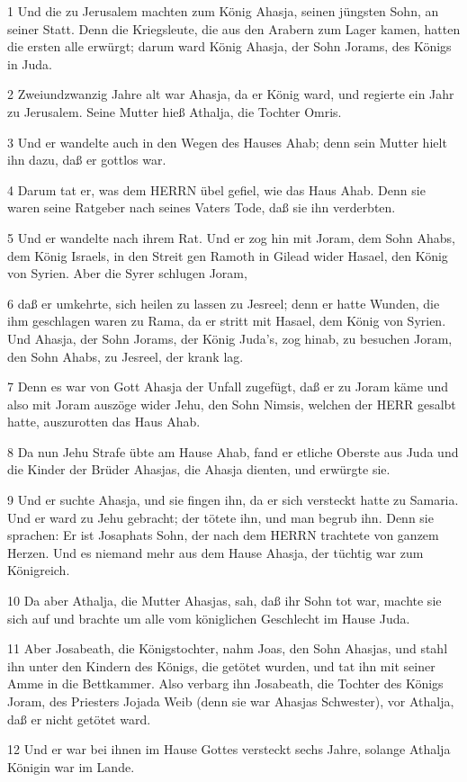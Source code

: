 \par 1 Und die zu Jerusalem machten zum König Ahasja, seinen jüngsten Sohn, an seiner Statt. Denn die Kriegsleute, die aus den Arabern zum Lager kamen, hatten die ersten alle erwürgt; darum ward König Ahasja, der Sohn Jorams, des Königs in Juda.
\par 2 Zweiundzwanzig Jahre alt war Ahasja, da er König ward, und regierte ein Jahr zu Jerusalem. Seine Mutter hieß Athalja, die Tochter Omris.
\par 3 Und er wandelte auch in den Wegen des Hauses Ahab; denn sein Mutter hielt ihn dazu, daß er gottlos war.
\par 4 Darum tat er, was dem HERRN übel gefiel, wie das Haus Ahab. Denn sie waren seine Ratgeber nach seines Vaters Tode, daß sie ihn verderbten.
\par 5 Und er wandelte nach ihrem Rat. Und er zog hin mit Joram, dem Sohn Ahabs, dem König Israels, in den Streit gen Ramoth in Gilead wider Hasael, den König von Syrien. Aber die Syrer schlugen Joram,
\par 6 daß er umkehrte, sich heilen zu lassen zu Jesreel; denn er hatte Wunden, die ihm geschlagen waren zu Rama, da er stritt mit Hasael, dem König von Syrien. Und Ahasja, der Sohn Jorams, der König Juda's, zog hinab, zu besuchen Joram, den Sohn Ahabs, zu Jesreel, der krank lag.
\par 7 Denn es war von Gott Ahasja der Unfall zugefügt, daß er zu Joram käme und also mit Joram auszöge wider Jehu, den Sohn Nimsis, welchen der HERR gesalbt hatte, auszurotten das Haus Ahab.
\par 8 Da nun Jehu Strafe übte am Hause Ahab, fand er etliche Oberste aus Juda und die Kinder der Brüder Ahasjas, die Ahasja dienten, und erwürgte sie.
\par 9 Und er suchte Ahasja, und sie fingen ihn, da er sich versteckt hatte zu Samaria. Und er ward zu Jehu gebracht; der tötete ihn, und man begrub ihn. Denn sie sprachen: Er ist Josaphats Sohn, der nach dem HERRN trachtete von ganzem Herzen. Und es niemand mehr aus dem Hause Ahasja, der tüchtig war zum Königreich.
\par 10 Da aber Athalja, die Mutter Ahasjas, sah, daß ihr Sohn tot war, machte sie sich auf und brachte um alle vom königlichen Geschlecht im Hause Juda.
\par 11 Aber Josabeath, die Königstochter, nahm Joas, den Sohn Ahasjas, und stahl ihn unter den Kindern des Königs, die getötet wurden, und tat ihn mit seiner Amme in die Bettkammer. Also verbarg ihn Josabeath, die Tochter des Königs Joram, des Priesters Jojada Weib (denn sie war Ahasjas Schwester), vor Athalja, daß er nicht getötet ward.
\par 12 Und er war bei ihnen im Hause Gottes versteckt sechs Jahre, solange Athalja Königin war im Lande.

